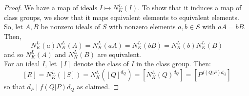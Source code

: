 \begin{proof}
	We have a map of ideals $I \mapsto N_K^L(I)$. To show that it induces a map of class groups, we show that it maps equivalent elements to equivalent elements. So, let $A,B$ be nonzero ideals of $S$ with nonzero elements $a,b \in S$ with $aA = bB$. Then,
	\[ N_K^L(a)N_K^L(A) = N_K^L(aA) = N_K^L(bB) = N_K^L(b)N_K^L(B) \]
	and so $N_K^L(A)$ and $N_K^L(B)$ are equivalent. \\
	
	For an ideal $I$, let $[I]$ denote the class of $I$ in the class group. Then:
	\[ [R] = N_K^L([S]) = N_K^L([Q]^{d_Q}) = [N_K^L(Q)^{d_Q}] = [P^{f(Q|P)d_Q}] \]
	so that $d_P \mid f(Q|P)d_Q$ as claimed.
\end{proof}
